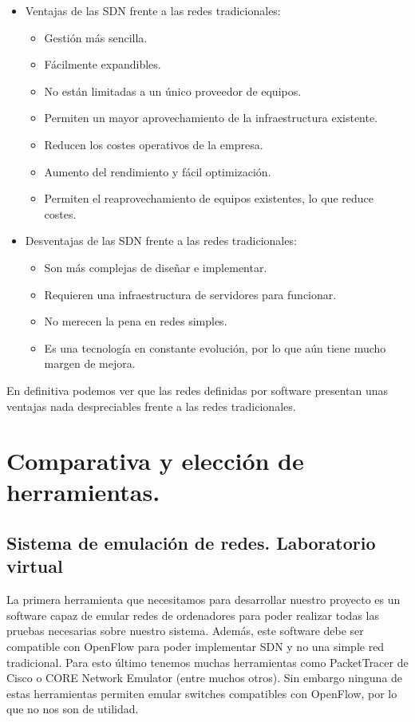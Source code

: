 \begin{itemize}
    \item Ventajas de las SDN frente a las redes tradicionales:
    \begin{itemize}
        \item Gestión más sencilla.
        \item Fácilmente expandibles.
        \item No están limitadas a un único proveedor de equipos.
        \item Permiten un mayor aprovechamiento de la infraestructura existente.
        \item Reducen los costes operativos de la empresa.
        \item Aumento del rendimiento y fácil optimización.
        \item Permiten el reaprovechamiento de equipos existentes, lo que reduce costes.
    \end{itemize}
    \item Desventajas de las SDN frente a las redes tradicionales:
    \begin{itemize}
        \item Son más complejas de diseñar e implementar.
        \item Requieren una infraestructura de servidores para funcionar.
        \item No merecen la pena en redes simples.
        \item Es una tecnología en constante evolución, por lo que aún tiene mucho margen de mejora.
    \end{itemize}
\end{itemize}

En definitiva podemos ver que las redes definidas por software presentan unas ventajas nada despreciables frente a las redes tradicionales.

\section{Comparativa y elección de herramientas.}

\subsection{Sistema de emulación de redes. Laboratorio virtual}

La primera herramienta que necesitamos para desarrollar nuestro proyecto es un software capaz de emular redes de ordenadores para poder realizar todas las pruebas necesarias sobre nuestro sistema. Además, este software debe ser compatible con OpenFlow para poder implementar SDN y no una simple red tradicional. Para esto último tenemos muchas herramientas como PacketTracer de Cisco o CORE Network Emulator (entre muchos otros). Sin embargo ninguna de estas herramientas permiten emular switches compatibles con OpenFlow, por lo que no nos son de utilidad.


